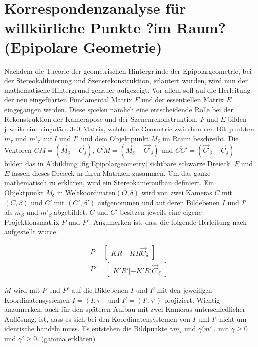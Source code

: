  
 \section{Korrespondenzanalyse für willkürliche Punkte ?im Raum? (Epipolare Geometrie)}
 Nachdem die Theorie der geometrischen Hintergründe der Epipolargeometrie, bei der Stereokalibrierung und Szenerekonstruktion, erläutert wurden, wird nun der mathematische Hintergrund genauer aufgezeigt. Vor allem soll auf die Herleitung der neu eingeführten Fundamental Matrix $F$ und der essentiellen Matrix $E$ eingegangen werden. Diese spielen nämlich eine entscheidende Rolle bei der Rekonstruktion der Kamerapose und der Szenenrekonstruktion\cite{Elements, HZ}. $F$ und $E$ bilden jeweils eine singuläre 3x3-Matrix, welche die Geometrie zwischen den Bildpunkten $m_\tau$ und $m'_\tau$ auf $I$ und $I'$ und dem Objektpunkt $M_\delta$ im Raum beschreibt. Die Vektoren $\overline{CM} = (\vec{M}_\delta - \vec{C}_\delta),\, \overline{C'M} = (\vec{M}_\delta - \vec{C'}_\delta)$ und $\overline{CC'} = (\vec{C'}_\delta - \vec{C}_\delta)$ bilden das in Abbildung \ref{fig:Epipolargeometry} sichtbare schwarze Dreieck. $F$ und $E$ fassen dieses Dreieck in ihren Matrizen zusammen. Um das ganze mathematisch zu erklären, wird ein Stereokameraufbau definiert. Ein Objektpunkt $M_\delta$ in Weltkoordinaten$(O,\delta)$ wird von zwei Kameras $C$ mit $(C,\beta)$ und $C'$ mit $(C',\beta')$ aufgenommen und auf deren Bildebenen $I$ und $I'$ als $m_\beta$ und $m'_\beta$ abgebildet. $C$ und $C'$ besitzen jeweils eine eigene Projektionsmatrix $P$ und $P'$. Anzumerken ist, dass die folgende Herleitung nach \cite{Elements} aufgestellt wurde.
 
 \begin{gather}
 	P = \begin{bmatrix}
 		KR|-KR\vec{C}_\delta
 	\end{bmatrix}\\
 	P' = \begin{bmatrix}
 		K'R'|-K'R'\vec{C'}_\delta
 	\end{bmatrix}
 \end{gather}
 
 $M$ wird mit $P$ und $P'$ auf die Bildebenen $I$ und $I'$ mit den jeweiligen Koordinatensystemen $I = (I,\tau)$ und $I'= (I',\tau')$ projiziert. Wichtig anzumerken, auch für den späteren Aufbau mit zwei Kameras unterschiedlicher Auflösung, ist, dass es sich bei den Koordinatensystemen von $I$ und $I'$ nicht um identische handeln muss.\cite{Elements} Es entstehen die Bildpunkte $\gamma m_\tau$ und $\gamma' m'_{\tau'}$ mit $\gamma \geq 0$ und $\gamma' \geq 0$. (gamma erklären)
 

